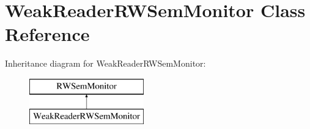 \hypertarget{classWeakReaderRWSemMonitor}{\section{Weak\-Reader\-R\-W\-Sem\-Monitor Class Reference}
\label{classWeakReaderRWSemMonitor}
}
Inheritance diagram for Weak\-Reader\-R\-W\-Sem\-Monitor\-:\begin{figure}[H]
\begin{center}
\leavevmode
\includegraphics[height=2.000000cm]{classWeakReaderRWSemMonitor}
\end{center}
\end{figure}
